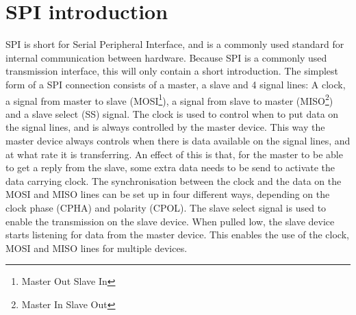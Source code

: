 \section{SPI introduction}
SPI is short for Serial Peripheral Interface, and is a commonly used standard for internal communication between hardware. Because SPI is a commonly used transmission interface, this will only contain a short introduction. The simplest form of a SPI connection consists of a master, a slave and 4 signal lines: A clock, a signal from master to slave (MOSI\footnote{Master Out Slave In}), a signal from slave to master (MISO\footnote{Master In Slave Out}) and a slave select (SS) signal. The clock is used to control when to put data on the signal lines, and is always controlled by the master device. This way the master device always controls when there is data available on the signal lines, and at what rate it is transferring. An effect of this is that, for the master to be able to get a reply from the slave, some extra data needs to be send to activate the data carrying clock. The synchronisation between the clock and the data on the MOSI and MISO lines can be set up in four different ways, depending on the clock phase (CPHA) and polarity (CPOL). The slave select signal is used to enable the transmission on the slave device. When pulled low, the slave device starts listening for data from the master device. This enables the use of the clock, MOSI and MISO lines for multiple devices. 






